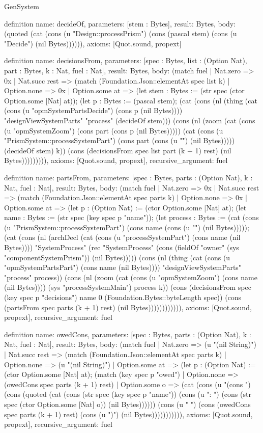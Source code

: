 \begin{lexlean}{GenSystem}
\begin{semanticmodule}
{definition{
  name: decideOf,
  parameters: [stem : Bytes],
  result: Bytes,
  body: (quoted (cat (cons (u "Design::processPrism") (cons (pascal stem) (cons (u "Decide") (nil Bytes)))))),
  axioms: [Quot.sound, propext]
}

definition{
  name: decisionsFrom,
  parameters: [spec : Bytes, list : (Option Nat), part : Bytes, k : Nat, fuel : Nat],
  result: Bytes,
  body: (match fuel
    | Nat.zero => 0x
    | Nat.succ rest => (match (Foundation.Json::elementAt spec list k)
      | Option.none => 0x
      | Option.some at => (let stem : Bytes := (str spec (ctor Option.some [Nat] at)); (let p : Bytes := (pascal stem); (cat (cons (nl (thing (cat (cons (u "opmSystemPartsDecide") (cons p (nil Bytes)))) "designViewSystemParts" "process" (decideOf stem))) (cons (nl (zoom (cat (cons (u "opmSystemZoom") (cons part (cons p (nil Bytes))))) (cat (cons (u "\"PrismSystem::processSystemPart") (cons part (cons (u "\"") (nil Bytes))))) (decideOf stem) k)) (cons (decisionsFrom spec list part (k + 1) rest) (nil Bytes))))))))),
  axioms: [Quot.sound, propext],
  recursive_argument: fuel
}

definition{
  name: partsFrom,
  parameters: [spec : Bytes, parts : (Option Nat), k : Nat, fuel : Nat],
  result: Bytes,
  body: (match fuel
    | Nat.zero => 0x
    | Nat.succ rest => (match (Foundation.Json::elementAt spec parts k)
      | Option.none => 0x
      | Option.some at => (let p : (Option Nat) := (ctor Option.some [Nat] at); (let name : Bytes := (str spec (key spec p "name")); (let process : Bytes := (cat (cons (u "\"PrismSystem::processSystemPart") (cons name (cons (u "\"") (nil Bytes))))); (cat (cons (nl (archDecl (cat (cons (u "processSystemPart") (cons name (nil Bytes)))) "SystemProcess" (rec "SystemProcess" (cons (fieldOf "owner" (sys "componentSystemPrism")) (nil Bytes))))) (cons (nl (thing (cat (cons (u "opmSystemPartsPart") (cons name (nil Bytes)))) "designViewSystemParts" "process" process)) (cons (nl (zoom (cat (cons (u "opmSystemZoom") (cons name (nil Bytes)))) (sys "processSystemMain") process k)) (cons (decisionsFrom spec (key spec p "decisions") name 0 (Foundation.Bytes::byteLength spec)) (cons (partsFrom spec parts (k + 1) rest) (nil Bytes)))))))))))),
  axioms: [Quot.sound, propext],
  recursive_argument: fuel
}

definition{
  name: owedCons,
  parameters: [spec : Bytes, parts : (Option Nat), k : Nat, fuel : Nat],
  result: Bytes,
  body: (match fuel
    | Nat.zero => (u "(nil String)")
    | Nat.succ rest => (match (Foundation.Json::elementAt spec parts k)
      | Option.none => (u "(nil String)")
      | Option.some at => (let p : (Option Nat) := (ctor Option.some [Nat] at); (match (key spec p "owed")
        | Option.none => (owedCons spec parts (k + 1) rest)
        | Option.some o => (cat (cons (u "(cons ") (cons (quoted (cat (cons (str spec (key spec p "name")) (cons (u ": ") (cons (str spec (ctor Option.some [Nat] o)) (nil Bytes)))))) (cons (u " ") (cons (owedCons spec parts (k + 1) rest) (cons (u ")") (nil Bytes))))))))))),
  axioms: [Quot.sound, propext],
  recursive_argument: fuel
}

}
\end{semanticmodule}
\end{lexlean}
